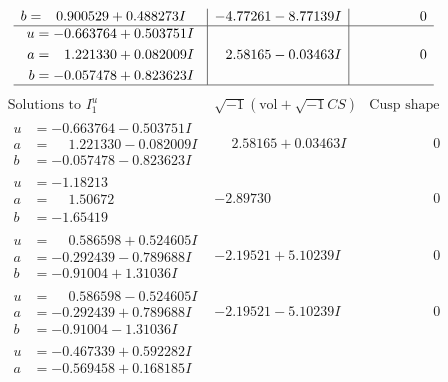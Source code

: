 \documentclass[1p]{elsarticle_modified}
\theoremstyle{definition}
\newcommand{\I}{\sqrt{-1}}
\begin{document}
$$\begin{array}{c|c|c}
\begin{aligned}
b &= \phantom{-}0.900529 + 0.488273 I\end{aligned}
 & -4.77261 - 8.77139 I & \phantom{-0.000000 } 0 \\ \hline\begin{aligned}
u &= -0.663764 + 0.503751 I \\
a &= \phantom{-}1.221330 + 0.082009 I \\
b &= -0.057478 + 0.823623 I\end{aligned}
 & \phantom{-}2.58165 - 0.03463 I & \phantom{-0.000000 } 0\\
 \hline 
 \end{array}$$\newpage$$\begin{array}{c|c|c}  
\text{Solutions to }I^u_{1}& \I (\text{vol} + \sqrt{-1}CS) & \text{Cusp shape}\\
 \hline 
\begin{aligned}
u &= -0.663764 - 0.503751 I \\
a &= \phantom{-}1.221330 - 0.082009 I \\
b &= -0.057478 - 0.823623 I\end{aligned}
 & \phantom{-}2.58165 + 0.03463 I & \phantom{-0.000000 } 0 \\ \hline\begin{aligned}
u &= -1.18213\phantom{ +0.000000I} \\
a &= \phantom{-}1.50672\phantom{ +0.000000I} \\
b &= -1.65419\phantom{ +0.000000I}\end{aligned}
 & -2.89730\phantom{ +0.000000I} & \phantom{-0.000000 } 0 \\ \hline\begin{aligned}
u &= \phantom{-}0.586598 + 0.524605 I \\
a &= -0.292439 - 0.789688 I \\
b &= -0.91004 + 1.31036 I\end{aligned}
 & -2.19521 + 5.10239 I & \phantom{-0.000000 } 0 \\ \hline\begin{aligned}
u &= \phantom{-}0.586598 - 0.524605 I \\
a &= -0.292439 + 0.789688 I \\
b &= -0.91004 - 1.31036 I\end{aligned}
 & -2.19521 - 5.10239 I & \phantom{-0.000000 } 0 \\ \hline\begin{aligned}
u &= -0.467339 + 0.592282 I \\
a &= -0.569458 + 0.168185 I \\

\end{aligned}
\end{array}$$
\end{document}
